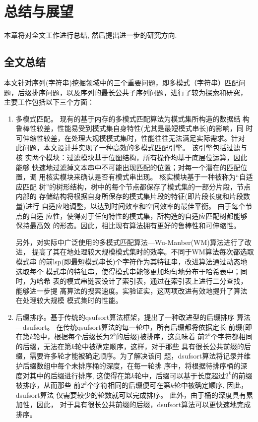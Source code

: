 \chapter{总结与展望}
\label{chap:Conclusion}

本章将对全文工作进行总结, 然后提出进一步的研究方向.

\section{全文总结}

本文针对序列(字符串)挖掘领域中的三个重要问题，即多模式（字符串）匹配问
题，后缀排序问题，以及序列的最长公共子序列问题，进行了较为探索和研究，
主要工作包括以下三个方面：

\begin{enumerate}
\item 多模式匹配。 现有的基于内存的多模式匹配算法为模式集所构造的数据结
  构鲁棒性较差，性能易受到模式集自身特性(尤其是最短模式串长)的影响，同
  时可伸缩性较差，在处理大规模模式集时，性能往往无法满足实际需求。针对
  此问题，本文设计并实现了一种高效的多模式匹配引擎。 该引擎包括过滤与核
  实两个模块：过滤模块基于位图结构，所有操作均基于底层位运算，因此能够
  快速地过滤掉文本串中不可能出现匹配的位置；对每一个潜在的匹配位置，调
  用核实模块来确认是否有模式串出现。 核实模块基于一种被称为“自适应匹配
  树”的树形结构，树中的每个节点都保存了模式集的一部分片段，节点内部的
  存储结构将根据自身所保存的模式集片段的特征(即片段长度和片段数量)进行
  自适应地调整，以达到时间效率和空间效率的最佳平衡。 由于每个节点的自适
  应性，使得对于任何特性的模式集，所构造的自适应匹配树都能够保持最高效
  的形态。因此，相比现有算法拥有更好的鲁棒性和可伸缩性。

  另外，对实际中广泛使用的多模式匹配算法---Wu-Manber(WM)算法进行了改进，
  提高了其在地处理较大规模模式集时的效率。不同于WM算法每次都选取模式串
  的前lsp(即最短模式串长)个字符作为其特征串，改进算法通过动态地选取每个
  模式串的特征串，使得模式串能够更加均匀地分布于哈希表中；同时，为哈希
  表的模式串链表设计了索引表，通过在索引表上进行二分查找，能够进一步提
  高算法的搜索速度。实验证实，这两项改进有效地提升了算法在处理较大规模
  模式集时的性能。

\item 后缀排序。基于传统的qsufsort算法框架，提出了一种改进型的后缀排序
  算法---dsufsort。 在传统qsufsort算法的每一轮中，所有后缀都将依据定长
  前缀(即在第$k$轮中，根据每个后缀长为$2^k$的后缀)被排序，这意味着
  前$2^k$个字符都相同的后缀，无法在第$k$轮中被确定顺序，这样，对于那些
  具有很长公共前缀的后缀，需要许多轮才能被确定顺序。为了解决该问
  题，dsufsort算法将记录并维护后缀数组中每个未排序桶的深度，在每一轮排
  序中，将根据待排序桶的深度对其中的后缀进行排序,
  这使得在第$k$轮中，后缀可以基于长度超过$2^k$的前缀被排序，从而那些
  前$2^k$个字符相同的后缀便可在第$k$轮中被确定顺序, 因此，dsufsort算法
  仅需要较少的轮数就可以完成排序。 此外，由于桶的深度具有累加性，因此，
  对于具有很长公共前缀的后缀，dsufsort算法可以更快速地完成排序。


\end{enumerate}
